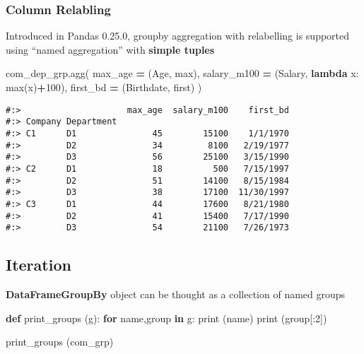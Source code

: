 \documentclass[
]{book}
\newenvironment{Shaded}{\begin{snugshade}}{\end{snugshade}}
\newcommand{\BuiltInTok}[1]{#1}
\newcommand{\ControlFlowTok}[1]{\textcolor[rgb]{0.27,0.27,0.27}{\textbf{#1}}}
\newcommand{\DecValTok}[1]{\textcolor[rgb]{0.06,0.06,0.06}{#1}}
\newcommand{\KeywordTok}[1]{\textcolor[rgb]{0.27,0.27,0.27}{\textbf{#1}}}
\newcommand{\NormalTok}[1]{#1}
\newcommand{\OperatorTok}[1]{\textcolor[rgb]{0.43,0.43,0.43}{\textbf{#1}}}
\newcommand{\StringTok}[1]{\textcolor[rgb]{0.5,0.5,0.5}{#1}}
\begin{document}
\hypertarget{column-relabling}{%
\subsubsection{Column Relabling}\label{column-relabling}}

Introduced in Pandas 0.25.0, groupby aggregation with relabelling is supported using ``named aggregation'' with \textbf{simple tuples}

\begin{Shaded}
\begin{Highlighting}[]
\NormalTok{com\_dep\_grp.agg(}
\NormalTok{  max\_age     }\OperatorTok{=}\NormalTok{ (}\StringTok{\textquotesingle{}Age\textquotesingle{}}\NormalTok{, }\BuiltInTok{max}\NormalTok{),}
\NormalTok{  salary\_m100 }\OperatorTok{=}\NormalTok{ (}\StringTok{\textquotesingle{}Salary\textquotesingle{}}\NormalTok{,  }\KeywordTok{lambda}\NormalTok{ x: }\BuiltInTok{max}\NormalTok{(x)}\OperatorTok{+}\DecValTok{100}\NormalTok{),  }
\NormalTok{  first\_bd    }\OperatorTok{=}\NormalTok{ (}\StringTok{\textquotesingle{}Birthdate\textquotesingle{}}\NormalTok{, }\StringTok{\textquotesingle{}first\textquotesingle{}}\NormalTok{)}
\NormalTok{)}
\end{Highlighting}
\end{Shaded}

\begin{verbatim}
#:>                     max_age  salary_m100    first_bd
#:> Company Department                                  
#:> C1      D1               45        15100    1/1/1970
#:>         D2               34         8100   2/19/1977
#:>         D3               56        25100   3/15/1990
#:> C2      D1               18          500   7/15/1997
#:>         D2               51        14100   8/15/1984
#:>         D3               38        17100  11/30/1997
#:> C3      D1               44        17600   8/21/1980
#:>         D2               41        15400   7/17/1990
#:>         D3               54        21100   7/26/1973
\end{verbatim}

\hypertarget{iteration-1}{%
\subsection{Iteration}\label{iteration-1}}

\textbf{DataFrameGroupBy} object can be thought as a collection of named groups

\begin{Shaded}
\begin{Highlighting}[]
\KeywordTok{def}\NormalTok{ print\_groups (g):}
    \ControlFlowTok{for}\NormalTok{ name,group }\KeywordTok{in}\NormalTok{ g:}
        \BuiltInTok{print}\NormalTok{ (name)}
        \BuiltInTok{print}\NormalTok{ (group[:}\DecValTok{2}\NormalTok{])}
        
\NormalTok{print\_groups (com\_grp)}
\end{Highlighting}
\end{Shaded}
\end{document}
